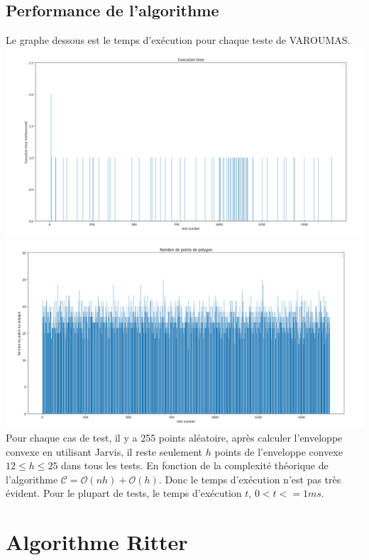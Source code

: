\documentclass[14px]{article}
\begin{document}
\subsection{Performance de l'algorithme}
Le graphe dessous est le temps d'exécution pour chaque teste de VAROUMAS.\\
\includegraphics[width=\textwidth]{testTime.png}\\
\includegraphics[width=\textwidth]{testNodes.png}\\
Pour chaque cas de test, il y a 255 points aléatoire, après calculer l'enveloppe convexe en utilisant Jarvis, il reste seulement $\mathit{h}$ points de l'enveloppe convexe $ 12 \leqslant h \leqslant 25 $ dans tous les tests. En fonction de la complexité théorique de l'algorithme  $\mathcal{C} = \mathcal{O}(nh) + \mathcal{O}(h)$.
Donc le temps d'exécution n'est pas très évident. Pour le plupart de tests, le temps d'exécution $\mathit{t}$, $ 0 < \mathit{t} <= 1 ms$.



\section{Algorithme Ritter}
\end{document}
